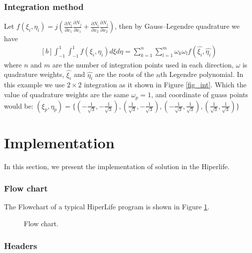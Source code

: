 \documentclass[]{article}
\begin{document}
\subsubsection{Integration method} \label{sec: int}
Let $f(\xi_{i},\eta_{i})=j(\frac{\partial N_{i}}{\partial x_{1}}
\frac{\partial N_{j}}{\partial x_{1}}+\frac{\partial N_{i}}{\partial x_{2}} 
\frac{\partial N_{j}}{\partial x_{2}})$, then by Gauss–Legendre quadrature we have
\begin{equation}\label{eq19}
	\begin{aligned}[b]
		\int_{-1}^1 \int_{-1}^1 f(\xi_{i},\eta_{i}) d\xi d\eta = \sum_{k=1}^{n}\sum_{l=1}^{m} \omega_{k}\omega_{l}f(\hat{\xi_{i}},\hat{\eta_{i}})
	\end{aligned}
\end{equation}
where $n$ and $m$ are the number of integration points used in each direction, $\omega$ is quadrature weights, $\hat{\xi_{i}}$ and $\hat{\eta_{i}}$ are the roots of the $n$th Legendre polynomial. In this example we use $2 \times 2$ integration as it shown in Figure \ref{fig_int}. Which the value of  quadrature weights are the same $\omega_{p}=1$, and coordinate of guass points would be:  $(\xi_{p}, \eta_{p})=\{(-\frac{1}{\sqrt{3}},-\frac{1}{\sqrt{3}}),  (\frac{1}{\sqrt{3}}, -\frac{1}{\sqrt{3}}),  (-\frac{1}{\sqrt{3}}, \frac{1}{\sqrt{3}}), (\frac{1}{\sqrt{3}}, \frac{1}{\sqrt{3}})\}$

\section{Implementation} \label{sec: imp}
In this section, we present the implementation of solution in the Hiperlife.
\nolinenumbers
\subsubsection{Flow chart} \label{sec: flw}
The Flowchart of a typical HiperLife program is shown in Figure \ref{fig_flw}.
\begin{figure}[htbp]
	\centering
	
	\caption{Flow chart.}
	\label{fig_flw}
\end{figure} 

\subsubsection{Headers} \label{sec: hdr}
\end{document}
